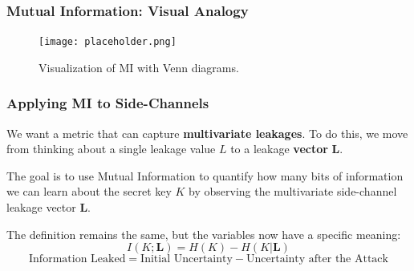 \begin{frame}
    \frametitle{Mutual Information: Visual Analogy}
    
    \begin{figure}
        \centering
        \texttt{[image: placeholder.png]} 
        \caption{Visualization of MI with Venn diagrams.}
    \end{figure}
    
\end{frame}


\begin{frame}
    \frametitle{Applying MI to Side-Channels}
    
        We want a metric that can capture \textbf{multivariate leakages}. To do this, we move from thinking about a single leakage value $L$ to a leakage \textbf{vector} $\mathbf{L}$.
        
        \vspace{0.3cm}
        
        The goal is to use Mutual Information to quantify how many bits of information we can learn about the secret key $K$ by observing the multivariate side-channel leakage vector $\mathbf{L}$.
    
    \begin{alertblock}{}
        The definition remains the same, but the variables now have a specific meaning:
        $$ I(K;\textbf{L}) = H(K) - H(K|\textbf{L}) $$
        $$ \text{Information Leaked} = \text{Initial Uncertainty} - \text{Uncertainty after the Attack} $$
    \end{alertblock}
\end{frame}

